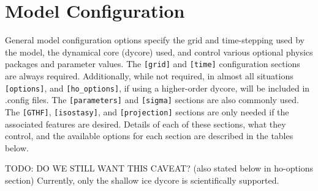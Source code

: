 \section{Model Configuration}\label{ug.sec.config}

General model configuration options 
specify the grid and time-stepping used by the model, 
the dynamical core (dycore) used, 
and control various optional physics packages and parameter values.
The \texttt{[grid]} and \texttt{[time]} configuration sections are always required.
Additionally, while not required, in almost all situations  \texttt{[options]}, 
 and \texttt{[ho\_options]}, if using a higher-order dycore, will be included in .config files.
The \texttt{[parameters]} and \texttt{[sigma]} sections are also commonly used.  
The \texttt{[GTHF]}, \texttt{[isostasy]}, and \texttt{[projection]} sections
are only needed if the associated features are desired.  Details of each of these
sections, what they control, and the available options for each section are described 
in the tables below.

TODO: DO WE STILL WANT THIS CAVEAT? (also stated below in ho-options section) Currently, only the shallow ice dycore is scientifically supported. 




